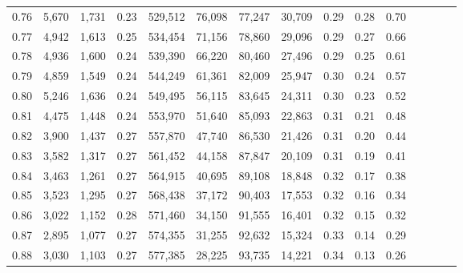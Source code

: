\begin{tabular}{rrrcrrrrrrrrrrr}
0.76 &   5,670 &  1,731 &                                       0.23 &  529,512 &   76,098 &   77,247 &   30,709 &  0.29 &  0.28 &                         0.70 \\
0.77 &   4,942 &  1,613 &                                       0.25 &  534,454 &   71,156 &   78,860 &   29,096 &  0.29 &  0.27 &                         0.66 \\
0.78 &   4,936 &  1,600 &                                       0.24 &  539,390 &   66,220 &   80,460 &   27,496 &  0.29 &  0.25 &                         0.61 \\
0.79 &   4,859 &  1,549 &                                       0.24 &  544,249 &   61,361 &   82,009 &   25,947 &  0.30 &  0.24 &                         0.57 \\
0.80 &   5,246 &  1,636 &                                       0.24 &  549,495 &   56,115 &   83,645 &   24,311 &  0.30 &  0.23 &                         0.52 \\
0.81 &   4,475 &  1,448 &                                       0.24 &  553,970 &   51,640 &   85,093 &   22,863 &  0.31 &  0.21 &                         0.48 \\
0.82 &   3,900 &  1,437 &                                       0.27 &  557,870 &   47,740 &   86,530 &   21,426 &  0.31 &  0.20 &                         0.44 \\
0.83 &   3,582 &  1,317 &                                       0.27 &  561,452 &   44,158 &   87,847 &   20,109 &  0.31 &  0.19 &                         0.41 \\
0.84 &   3,463 &  1,261 &                                       0.27 &  564,915 &   40,695 &   89,108 &   18,848 &  0.32 &  0.17 &                         0.38 \\
0.85 &   3,523 &  1,295 &                                       0.27 &  568,438 &   37,172 &   90,403 &   17,553 &  0.32 &  0.16 &                         0.34 \\
0.86 &   3,022 &  1,152 &                                       0.28 &  571,460 &   34,150 &   91,555 &   16,401 &  0.32 &  0.15 &                         0.32 \\
0.87 &   2,895 &  1,077 &                                       0.27 &  574,355 &   31,255 &   92,632 &   15,324 &  0.33 &  0.14 &                         0.29 \\
0.88 &   3,030 &  1,103 &                                       0.27 &  577,385 &   28,225 &   93,735 &   14,221 &  0.34 &  0.13 &                         0.26 \\

\end{tabular}
